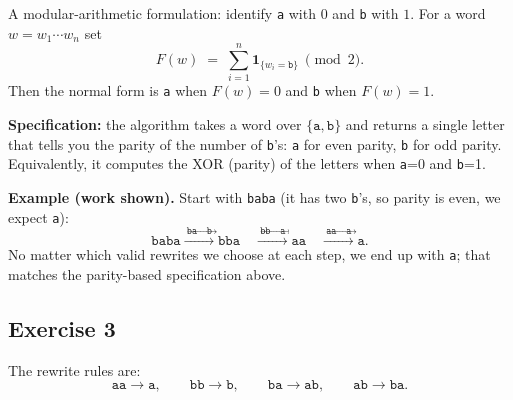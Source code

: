 \documentclass[12pt]{article}
\begin{document}
\begin{enumerate}[label=(\alph*)]
  A modular-arithmetic formulation: identify \texttt{a} with $0$ and \texttt{b} with $1$. For a word $w=w_1\cdots w_n$ set
  \[
    F(w)\;=\;\sum_{i=1}^n \mathbf{1}_{\{w_i=\texttt{b}\}}\ \pmod{2}.
  \]
  Then the normal form is \texttt{a} when $F(w)=0$ and \texttt{b} when $F(w)=1$.
  
  \textbf{Specification:} the algorithm takes a word over $\{\texttt{a},\texttt{b}\}$ and returns a single letter that tells you the parity of the number of \texttt{b}'s: \texttt{a} for even parity, \texttt{b} for odd parity. Equivalently, it computes the XOR (parity) of the letters when \texttt{a}=0 and \texttt{b}=1.
\end{enumerate}

\bigskip

\textbf{Example (work shown).} Start with \texttt{baba} (it has two \texttt{b}'s, so parity is even, we expect \texttt{a}):
\[
\texttt{baba} \xrightarrow{\ \texttt{ba}\to\texttt{b}\ } \texttt{bba}
\quad\xrightarrow{\ \texttt{bb}\to\texttt{a}\ } \texttt{aa}
\quad\xrightarrow{\ \texttt{aa}\to\texttt{a}\ } \texttt{a}.
\]
No matter which valid rewrites we choose at each step, we end up with \texttt{a}; that matches the parity-based specification above.

\subsection*{Exercise 3}

The rewrite rules are:
\[
\texttt{aa}\to\texttt{a},\qquad
\texttt{bb}\to\texttt{b},\qquad
\texttt{ba}\to\texttt{ab},\qquad
\texttt{ab}\to\texttt{ba}.
\]
\end{document}
